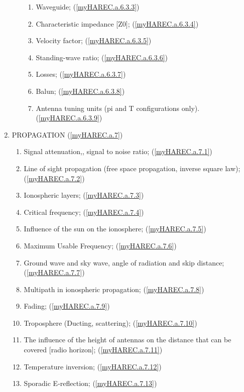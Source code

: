 \begin{enumerate}
\begin{enumerate}[noitemsep]
\begin{enumerate}[noitemsep]
\item Waveguide; (\ref{myHAREC.a.6.3.3})\label{HAREC.a.6.3.3}
\item Characteristic impedance [Z0]; (\ref{myHAREC.a.6.3.4})\label{HAREC.a.6.3.4}
\item Velocity factor; (\ref{myHAREC.a.6.3.5})\label{HAREC.a.6.3.5}
\item Standing-wave ratio; (\ref{myHAREC.a.6.3.6})\label{HAREC.a.6.3.6}
\item Losses; (\ref{myHAREC.a.6.3.7})\label{HAREC.a.6.3.7}
\item Balun; (\ref{myHAREC.a.6.3.8})\label{HAREC.a.6.3.8}
\item Antenna tuning units (pi and T configurations only). (\ref{myHAREC.a.6.3.9})\label{HAREC.a.6.3.9}
\end{enumerate}
\end{enumerate}
\item PROPAGATION (\ref{myHAREC.a.7})\label{HAREC.a.7}
\begin{enumerate}[noitemsep]
\item Signal attenuation,, signal to noise ratio; (\ref{myHAREC.a.7.1})\label{HAREC.a.7.1}
\item Line of sight propagation (free space propagation, inverse square law); (\ref{myHAREC.a.7.2})\label{HAREC.a.7.2}
\item Ionospheric layers; (\ref{myHAREC.a.7.3})\label{HAREC.a.7.3}
\item Critical frequency; (\ref{myHAREC.a.7.4})\label{HAREC.a.7.4}
\item Influence of the sun on the ionosphere; (\ref{myHAREC.a.7.5})\label{HAREC.a.7.5}
\item Maximum Usable Frequency; (\ref{myHAREC.a.7.6})\label{HAREC.a.7.6}
\item Ground wave and sky wave, angle of radiation and skip distance; (\ref{myHAREC.a.7.7})\label{HAREC.a.7.7}
\item Multipath in ionospheric propagation; (\ref{myHAREC.a.7.8})\label{HAREC.a.7.8}
\item Fading; (\ref{myHAREC.a.7.9})\label{HAREC.a.7.9}
\item Troposphere (Ducting, scattering); (\ref{myHAREC.a.7.10})\label{HAREC.a.7.10}
\item The influence of the height of antennas on the distance that can be covered [radio horizon]; (\ref{myHAREC.a.7.11})\label{HAREC.a.7.11}
\item Temperature inversion; (\ref{myHAREC.a.7.12})\label{HAREC.a.7.12}
\item Sporadic E-reflection; (\ref{myHAREC.a.7.13})\label{HAREC.a.7.13}

\end{enumerate}
\end{enumerate}
